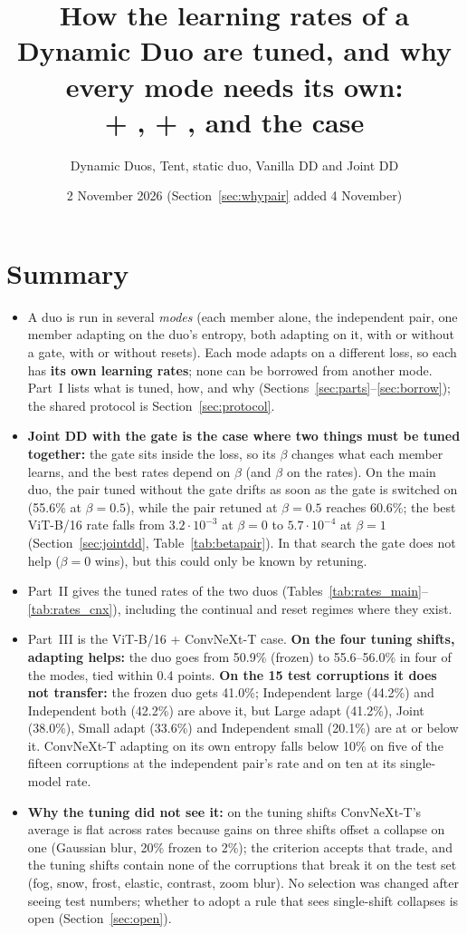 \documentclass[10pt]{article}
\title{How the learning rates of a Dynamic Duo are tuned, and why every mode needs its own:\\
  \vit{} + \rn{}, \vit{} + \cnx{}, and the \cnx{} case}
\author{Dynamic Duos, Tent, static duo, Vanilla DD and Joint DD}
\date{2 November 2026 (Section~\ref{sec:whypair} added 4 November)}
\newcommand{\vit}{ViT-B/16}
\newcommand{\cnx}{ConvNeXt-T}
\newcommand{\lr}[2]{\(#1{\cdot}10^{#2}\)}
\begin{document}
\maketitle

\section*{Summary}
\begin{itemize}
  \item A duo is run in several \emph{modes} (each member alone, the independent pair, one member adapting on the duo's entropy, both adapting on it, with or without a gate, with or without resets). Each mode adapts on a different loss, so each has \textbf{its own learning rates}; none can be borrowed from another mode. Part~I lists what is tuned, how, and why (Sections~\ref{sec:parts}--\ref{sec:borrow}); the shared protocol is Section~\ref{sec:protocol}.
  \item \textbf{Joint DD with the gate is the case where two things must be tuned together:} the gate sits inside the loss, so its \(\beta\) changes what each member learns, and the best rates depend on \(\beta\) (and \(\beta\) on the rates). On the main duo, the pair tuned without the gate drifts as soon as the gate is switched on (55.6\% at \(\beta=0.5\)), while the pair retuned at \(\beta=0.5\) reaches 60.6\%; the best \vit{} rate falls from \lr{3.2}{-3} at \(\beta=0\) to \lr{5.7}{-4} at \(\beta=1\) (Section~\ref{sec:jointdd}, Table~\ref{tab:betapair}). In that search the gate does not help (\(\beta=0\) wins), but this could only be known by retuning.
  \item Part~II gives the tuned rates of the two duos (Tables~\ref{tab:rates_main}--\ref{tab:rates_cnx}), including the continual and reset regimes where they exist.
  \item Part~III is the \vit{} + \cnx{} case. \textbf{On the four tuning shifts, adapting helps:} the duo goes from 50.9\% (frozen) to 55.6--56.0\% in four of the modes, tied within 0.4 points. \textbf{On the 15 test corruptions it does not transfer:} the frozen duo gets 41.0\%; Independent large (44.2\%) and Independent both (42.2\%) are above it, but Large adapt (41.2\%), Joint (38.0\%), Small adapt (33.6\%) and Independent small (20.1\%) are at or below it. \cnx{} adapting on its own entropy falls below 10\% on five of the fifteen corruptions at the independent pair's rate and on ten at its single-model rate.
  \item \textbf{Why the tuning did not see it:} on the tuning shifts \cnx{}'s average is flat across rates because gains on three shifts offset a collapse on one (Gaussian blur, 20\% frozen to 2\%); the criterion accepts that trade, and the tuning shifts contain none of the corruptions that break it on the test set (fog, snow, frost, elastic, contrast, zoom blur). No selection was changed after seeing test numbers; whether to adopt a rule that sees single-shift collapses is open (Section~\ref{sec:open}).
\end{itemize}
\end{document}
